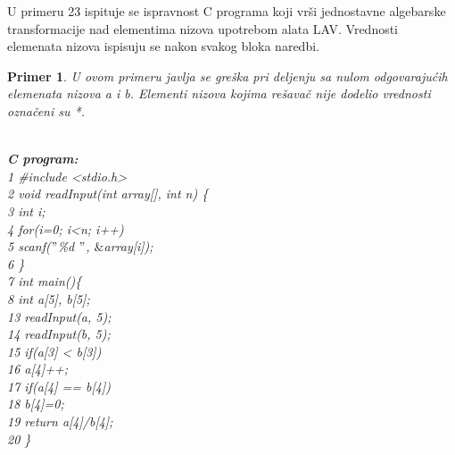 \documentclass[12pt,oneside]{memoir}
\newcommand\tab[1][0.5cm]{\hspace*{#1}}
\newtheorem{primer}{Primer}
\begin{document}
U primeru 23 ispituje se ispravnost C programa koji vrši jednostavne algebarske transformacije nad elementima nizova upotrebom alata LAV. Vrednosti elemenata nizova ispisuju se nakon svakog bloka naredbi.
\begin{primer}
U ovom primeru javlja se greška pri deljenju sa nulom odgovarajućih elemenata nizova a i b. Elementi nizova kojima rešavač nije dodelio vrednosti označeni su *.\\ \\
\hspace{-0.6cm} \label{example23}
\begin{minipage}[b]{0.5\textwidth}
\textbf{C program:}\\
1 \hspace{0.1cm} \#include <stdio.h> \\
2 \hspace{0.1cm} void readInput(int array[], int n) \{ \\
3	\hspace{0.15cm} \tab int i; \\
4	\hspace{0.15cm} \tab for(i=0; i<n; i++) \\
5	\hspace{0.15cm} \tab \tab	scanf($"$\%d $"$, $\&$array[i]); \\
6 \hspace{0.1cm} \} \\
7 \hspace{0.1cm} int main()\{ \\
8	\hspace{0.15cm} \tab int a[5], b[5];\\
13  \hspace{-0.08cm} \tab readInput(a, 5); \\
14  \hspace{-0.08cm} \tab readInput(b, 5); \\
15  \hspace{-0.08cm} \tab if(a[3] < b[3]) \\
16	\hspace{-0.08cm} \tab \tab	a[4]++; \\
17	\hspace{-0.08cm} \tab if(a[4] == b[4]) \\
18	\hspace{-0.08cm} \tab \tab	b[4]=0; \\
19	\hspace{-0.08cm} \tab return a[4]/b[4]; \\
20 \}
\end{minipage}

\end{primer}
\end{document}
